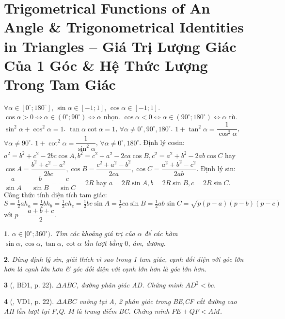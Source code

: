 \documentclass{article}
\newtheorem{baitoan}{}
\begin{document}
\section{Trigometrical Functions of An Angle \& Trigonometrical Identities in Triangles -- Giá Trị Lượng Giác Của 1 Góc \& Hệ Thức Lượng Trong Tam Giác}
 $\forall\alpha\in[0^\circ;180^\circ]$, $\sin\alpha\in[-1;1]$, $\cos\alpha\in[-1;1]$.  $\cos\alpha > 0\Leftrightarrow\alpha\in(0^\circ;90^\circ)\Leftrightarrow\alpha$ nhọn. $\cos\alpha < 0\Leftrightarrow\alpha\in(90^\circ;180^\circ)\Leftrightarrow\alpha$ tù. $\sin^2\alpha + \cos^2\alpha = 1$. $\tan\alpha\cot\alpha = 1$, $\forall\alpha\ne0^\circ,90^\circ,180^\circ$. $1 + \tan^2\alpha = \dfrac{1}{\cos^2\alpha}$, $\forall\alpha\ne90^\circ$. $1 + \cot^2\alpha = \dfrac{1}{\sin^2\alpha}$, $\forall\alpha\ne0^\circ,180^\circ$.  {\sf Định lý cosin}: $a^2 = b^2 + c^2 - 2bc\cos A,b^2 = c^2 + a^2 - 2ca\cos B,c^2 = a^2 + b^2 - 2ab\cos C$ hay $\cos A = \dfrac{b^2 + c^2 - a^2}{2bc},\cos B = \dfrac{c^2 + a^2 - b^2}{2ca},\cos C = \dfrac{a^2 + b^2 - c^2}{2ab}$.  {\sf Định lý sin}: $\dfrac{a}{\sin A} = \dfrac{b}{\sin B} = \dfrac{c}{\sin C} = 2R$ hay $a = 2R\sin A,b = 2R\sin B,c = 2R\sin C$.  Công thức tính diện tích tam giác: $S = \frac{1}{2}ah_a = \frac{1}{2}bh_b = \frac{1}{2}ch_c = \frac{1}{2}bc\sin A = \frac{1}{2}ca\sin B = \frac{1}{2}ab\sin C = \sqrt{p(p - a)(p - b)(p - c)}$ với $p = \dfrac{a + b + c}{2}$.

\begin{baitoan}
	$\alpha\in[0^\circ;360^\circ)$. Tìm các khoảng giá trị của $\alpha$ để các hàm $\sin\alpha,\cos\alpha,\tan\alpha,\cot\alpha$ lần lượt bằng $0$, âm, dương.
\end{baitoan}

\begin{baitoan}
	Dùng định lý sin, giải thích vì sao trong 1 tam giác, cạnh đối diện với góc lớn hơn là cạnh lớn hơn \& góc đối diện với cạnh lớn hơn là góc lớn hơn.
\end{baitoan}

\begin{baitoan}[\cite{Hai_Hung_Thu_Tung2022_tap_1}, BĐ1, p. 22]
	$\Delta ABC$, đường phân giác AD. Chứng minh $AD^2 < bc$.
\end{baitoan}

\begin{baitoan}[\cite{Hai_Hung_Thu_Tung2022_tap_1}, VD1, p. 22]
	$\Delta ABC$ vuông tại A, 2 phân giác trong BE,CF cắt đường cao AH lần lượt tại P,Q. M là trung điểm BC. Chứng minh $PE + QF < AM$.
\end{baitoan}
\end{document}
